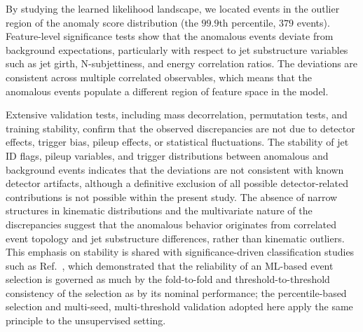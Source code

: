 \documentclass[11pt,a4paper,twocolumn]{article}
\begin{document}
By studying the learned likelihood landscape, we located events in the outlier region of the anomaly score distribution (the $99.9$th percentile, $379$ events). Feature-level significance tests show that the anomalous events deviate from background expectations, particularly with respect to jet substructure variables such as jet girth, N-subjettiness, and energy correlation ratios. The deviations are consistent across multiple correlated observables, which means that the anomalous events populate a different region of feature space in the model.

Extensive validation tests, including mass decorrelation, permutation tests, and training stability, confirm that the observed discrepancies are not due to detector effects, trigger bias, pileup effects, or statistical fluctuations. The stability of jet ID flags, pileup variables, and trigger distributions between anomalous and background events indicates that the deviations are not consistent with known detector artifacts, although a definitive exclusion of all possible detector-related contributions is not possible within the present study. The absence of narrow structures in kinematic distributions and the multivariate nature of the discrepancies suggest that the anomalous behavior originates from correlated event topology and jet substructure differences, rather than kinematic outliers. This emphasis on stability is shared with significance-driven classification studies such as Ref.~\cite{Pujari2026Contrastive}, which demonstrated that the reliability of an ML-based event selection is governed as much by the fold-to-fold and threshold-to-threshold consistency of the selection as by its nominal performance; the percentile-based selection and multi-seed, multi-threshold validation adopted here apply the same principle to the unsupervised setting.
\end{document}
